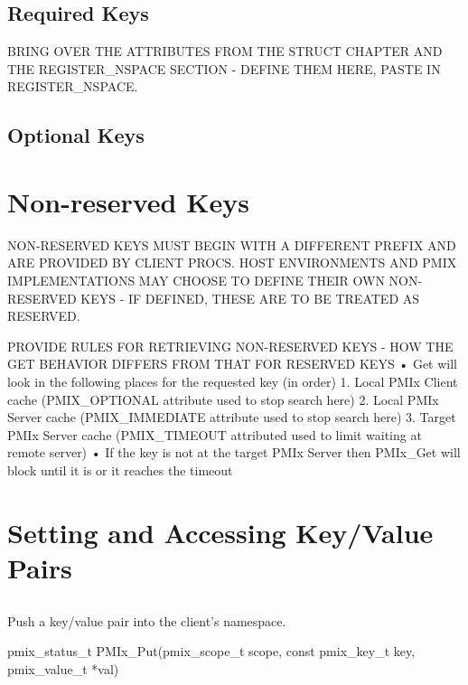 \subsection{Required Keys}
BRING OVER THE ATTRIBUTES FROM THE STRUCT CHAPTER AND THE REGISTER_NSPACE SECTION - DEFINE THEM HERE, PASTE IN REGISTER_NSPACE.


\subsection{Optional Keys}

\section{Non-reserved Keys}

NON-RESERVED KEYS MUST BEGIN WITH A DIFFERENT PREFIX AND ARE PROVIDED BY CLIENT PROCS. HOST ENVIRONMENTS AND PMIX IMPLEMENTATIONS MAY CHOOSE TO DEFINE THEIR OWN NON-RESERVED KEYS - IF DEFINED, THESE ARE TO BE TREATED AS RESERVED.

PROVIDE RULES FOR RETRIEVING NON-RESERVED KEYS - HOW THE GET BEHAVIOR DIFFERS FROM THAT FOR RESERVED KEYS
• Get will look in the following places for the requested key (in order)
1. Local PMIx Client cache (PMIX_OPTIONAL attribute used to stop search here)
2. Local PMIx Server cache (PMIX_IMMEDIATE attribute used to stop search here)
3. Target PMIx Server cache (PMIX_TIMEOUT attributed used to limit waiting at remote server)
• If the key is not at the target PMIx Server then PMIx_Get will block until it is or it reaches the timeout


\section{Setting and Accessing Key/Value Pairs}
\label{chap:api_kv_mgmt:access}


\subsection{}

\summary

Push a key/value pair into the client's namespace.

\format

\cspecificstart
\begin{codepar}
pmix_status_t
PMIx_Put(pmix_scope_t scope,
         const pmix_key_t key,
         pmix_value_t *val)
\end{codepar}
\cspecificend

